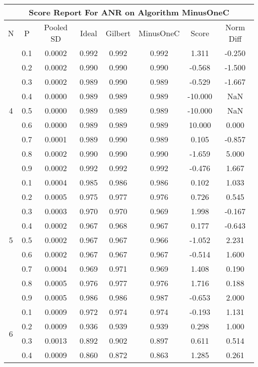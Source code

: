 \documentclass[11pt,a4paper]{report}
\begin{document}
\begin{longtable}{ | c | c || c | c | c | c | c | c | }
\hline
\multicolumn{8}{|c|}{ Score Report For ANR on Algorithm MinusOneC} \\
\hline
N & P & Pooled SD &  Ideal &  Gilbert & MinusOneC  & Score & Norm Diff \\
 \hline
 \hline
 \endhead
\multirow{9}{*}{4} & 0.1 & 0.0002 & 0.992 & 0.992 & 0.992 & 1.311 & -0.250 \\
 & 0.2 & 0.0002 & 0.990 & 0.990 & 0.990 & -0.568 & -1.500 \\
 & 0.3 & 0.0002 & 0.989 & 0.990 & 0.989 & -0.529 & -1.667 \\
 & 0.4 & 0.0000 & 0.989 & 0.989 & 0.989 & -10.000 & NaN \\
 & 0.5 & 0.0000 & 0.989 & 0.989 & 0.989 & -10.000 & NaN \\
 & 0.6 & 0.0000 & 0.989 & 0.989 & 0.989 & 10.000 & 0.000 \\
 & 0.7 & 0.0001 & 0.989 & 0.990 & 0.989 & 0.105 & -0.857 \\
 & 0.8 & 0.0002 & 0.990 & 0.990 & 0.990 & -1.659 & 5.000 \\
 & 0.9 & 0.0002 & 0.992 & 0.992 & 0.992 & -0.476 & 1.667 \\
 \hline
\multirow{9}{*}{5} & 0.1 & 0.0004 & 0.985 & 0.986 & 0.986 & 0.102 & 1.033 \\
 & 0.2 & 0.0005 & 0.975 & 0.977 & 0.976 & 0.726 & 0.545 \\
 & 0.3 & 0.0003 & 0.970 & 0.970 & 0.969 & 1.998 & -0.167 \\
 & 0.4 & 0.0002 & 0.967 & 0.968 & 0.967 & 0.177 & -0.643 \\
 & 0.5 & 0.0002 & 0.967 & 0.967 & 0.966 & -1.052 & 2.231 \\
 & 0.6 & 0.0002 & 0.967 & 0.967 & 0.967 & -0.514 & 1.600 \\
 & 0.7 & 0.0004 & 0.969 & 0.971 & 0.969 & 1.408 & 0.190 \\
 & 0.8 & 0.0005 & 0.976 & 0.977 & 0.976 & 1.716 & 0.188 \\
 & 0.9 & 0.0005 & 0.986 & 0.986 & 0.987 & -0.653 & 2.000 \\
 \hline
\multirow{9}{*}{6} & 0.1 & 0.0009 & 0.972 & 0.974 & 0.974 & -0.193 & 1.131 \\
 & 0.2 & 0.0009 & 0.936 & 0.939 & 0.939 & 0.298 & 1.000 \\
 & 0.3 & 0.0013 & 0.892 & 0.902 & 0.897 & 0.611 & 0.514 \\
 & 0.4 & 0.0009 & 0.860 & 0.872 & 0.863 & 1.285 & 0.261 \\

\end{longtable}
\end{document}

